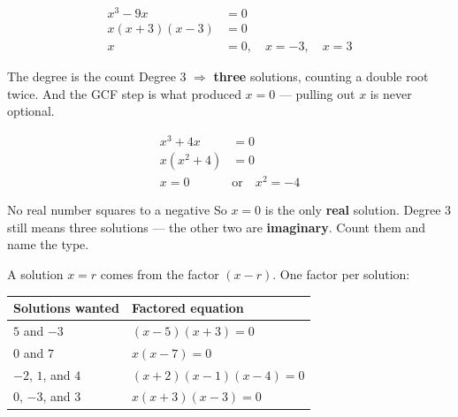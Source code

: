 \documentclass[aspectratio=169, 11pt]{beamer}
\begin{document}
\begin{frame}[t, plain]
  \[
  \begin{aligned}
    x^3-9x &= 0 \\
    x(x+3)(x-3) &= 0 \\
    x &= 0, \quad x = -3, \quad x = 3
  \end{aligned}
  \]
  \begin{block}{The degree is the count}
    Degree $3$ $\Rightarrow$ \textbf{three} solutions, counting a double root twice. And the GCF
    step is what produced $x=0$ --- pulling out $x$ is never optional.
  \end{block}
\end{frame}

\begin{frame}[t, plain]
  \[
  \begin{aligned}
    x^3+4x &= 0 \\
    x\left(x^2+4\right) &= 0 \\
    x = 0 \quad&\text{or}\quad x^2 = -4
  \end{aligned}
  \]
  \begin{block}{No real number squares to a negative}
    So $x=0$ is the only \textbf{real} solution. Degree $3$ still means three solutions --- the
    other two are \textbf{imaginary}. Count them and name the type.
  \end{block}
\end{frame}

\begin{frame}[t, plain]
  A solution $x=r$ comes from the factor $(x-r)$. One factor per solution:
  \vspace{0.15cm}
  \renewcommand{\arraystretch}{1.5}
  \begin{tabularx}{\textwidth}{@{}p{4.4cm} X@{}}
    \textbf{Solutions wanted} & \textbf{Factored equation} \\
    \hline
    $5$ and $-3$          & $(x-5)(x+3)=0$ \\
    $0$ and $7$           & $x(x-7)=0$ \\
    $-2$, $1$, and $4$    & $(x+2)(x-1)(x-4)=0$ \\
    $0$, $-3$, and $3$    & $x(x+3)(x-3)=0$ \\
  \end{tabularx}
\end{frame}
\end{document}
